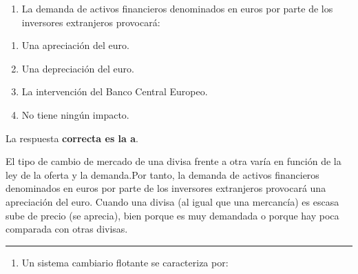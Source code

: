 \documentclass[
  letterpaper,
  DIV=11,
  numbers=noendperiod]{scrreprt}
\providecommand{\tightlist}{%
  \setlength{\itemsep}{0pt}\setlength{\parskip}{0pt}}\usepackage{longtable,booktabs,array}
\begin{document}

\begin{enumerate}
\def\labelenumi{\arabic{enumi}.}
\tightlist
\item
  La demanda de activos financieros denominados en euros por parte de
  los inversores extranjeros provocará:
\end{enumerate}

\begin{enumerate}
\def\labelenumi{\alph{enumi})}
\item
  Una apreciación del euro.
\item
  Una depreciación del euro.
\item
  La intervención del Banco Central Europeo.
\item
  No tiene ningún impacto.
\end{enumerate}

\begin{tcolorbox}[enhanced jigsaw, left=2mm, opacityback=0, colback=white, breakable, arc=.35mm, bottomrule=.15mm, rightrule=.15mm, toprule=.15mm, leftrule=.75mm, colframe=quarto-callout-tip-color-frame]
\begin{minipage}[t]{5.5mm}
\textcolor{quarto-callout-tip-color}{\faLightbulb}
\end{minipage}%
\begin{minipage}[t]{\textwidth - 5.5mm}

La respuesta \textbf{correcta es la a}.

El tipo de cambio de mercado de una divisa frente a otra varía en
función de la ley de la oferta y la demanda.Por tanto, la demanda de
activos financieros denominados en euros por parte de los inversores
extranjeros provocará una apreciación del euro. Cuando una divisa (al
igual que una mercancía) es escasa sube de precio (se aprecia), bien
porque es muy demandada o porque hay poca comparada con otras divisas.

\end{minipage}%
\end{tcolorbox}

\begin{center}\rule{0.5\linewidth}{0.5pt}\end{center}

\begin{enumerate}
\def\labelenumi{\arabic{enumi}.}
\setcounter{enumi}{1}
\tightlist
\item
  Un sistema cambiario flotante se caracteriza por:
\end{enumerate}
\end{document}
